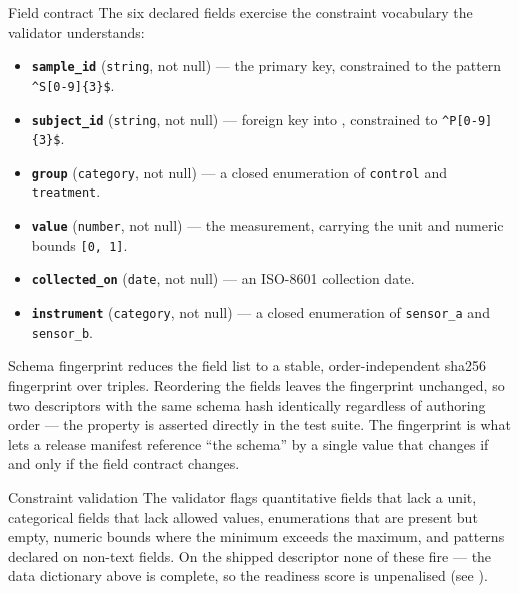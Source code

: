 \documentclass[
  ignorenonframetext,
]{beamer}
\providecommand{\tightlist}{%
  \setlength{\itemsep}{0pt}\setlength{\parskip}{0pt}}
\begin{document}
\begin{frame}{Field contract}
\protect{}\label{field-contract}
The six declared fields exercise the constraint vocabulary the validator
understands:

\begin{itemize}
\tightlist
\item
  \textbf{\texttt{sample\_id}} (\texttt{string}, not null) --- the
  primary key, constrained to the pattern
  \texttt{\^{}S{[}0-9{]}\{3\}\$}.
\item
  \textbf{\texttt{subject\_id}} (\texttt{string}, not null) --- foreign
  key into , constrained to
  \texttt{\^{}P{[}0-9{]}\{3\}\$}.
\item
  \textbf{\texttt{group}} (\texttt{category}, not null) --- a closed
  enumeration of \texttt{control} and \texttt{treatment}.
\item
  \textbf{\texttt{value}} (\texttt{number}, not null) --- the
  measurement, carrying the unit  and numeric
  bounds \texttt{{[}0,\ 1{]}}.
\item
  \textbf{\texttt{collected\_on}} (\texttt{date}, not null) --- an
  ISO-8601 collection date.
\item
  \textbf{\texttt{instrument}} (\texttt{category}, not null) --- a
  closed enumeration of \texttt{sensor\_a} and \texttt{sensor\_b}.
\end{itemize}
\end{frame}

\begin{frame}{Schema fingerprint}
\protect{}\label{schema-fingerprint}
 reduces the field list to a stable,
order-independent sha256 fingerprint over
 triples. Reordering the fields leaves
the fingerprint unchanged, so two descriptors with the same schema hash
identically regardless of authoring order --- the property is asserted
directly in the test suite. The fingerprint is what lets a release
manifest reference ``the schema'' by a single value that changes if and
only if the field contract changes.
\end{frame}

\begin{frame}[allowframebreaks]{Constraint validation}
\protect{}\label{constraint-validation}
The validator flags quantitative fields that lack a unit, categorical
fields that lack allowed values, enumerations that are present but
empty, numeric bounds where the minimum exceeds the maximum, and
patterns declared on non-text fields. On the shipped descriptor none of
these fire --- the data dictionary above is complete, so the readiness
score is unpenalised (see ).
\end{frame}
\end{document}
